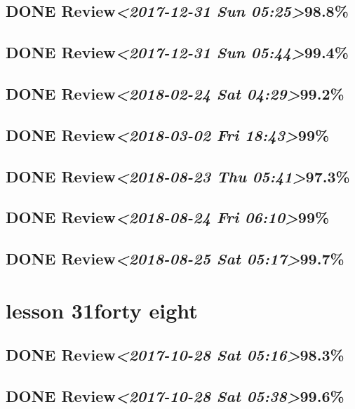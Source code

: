 \documentclass[11pt]{ctexart}
\begin{document}
\subsection{{\bfseries\sffamily DONE} Review\textit{<2017-12-31 Sun 05:25>}98.8\%}
\label{sec:org800593f}
\subsection{{\bfseries\sffamily DONE} Review\textit{<2017-12-31 Sun 05:44>}99.4\%}
\label{sec:org8557818}
\subsection{{\bfseries\sffamily DONE} Review\textit{<2018-02-24 Sat 04:29>}99.2\%}
\label{sec:org5133f05}
\subsection{{\bfseries\sffamily DONE} Review\textit{<2018-03-02 Fri 18:43>}99\%}
\label{sec:orgd3ca5e7}
\subsection{{\bfseries\sffamily DONE} Review\textit{<2018-08-23 Thu 05:41>}97.3\%}
\label{sec:orgdf9a2c3}
\subsection{{\bfseries\sffamily DONE} Review\textit{<2018-08-24 Fri 06:10>}99\%}
\label{sec:org1005b5a}
\subsection{{\bfseries\sffamily DONE} Review\textit{<2018-08-25 Sat 05:17>}99.7\%}
\label{sec:orga892c4b}
\section{lesson 31forty eight}
\label{sec:org9cde4fe}
\subsection{{\bfseries\sffamily DONE} Review\textit{<2017-10-28 Sat 05:16>}98.3\%}
\label{sec:orged74a3f}
\subsection{{\bfseries\sffamily DONE} Review\textit{<2017-10-28 Sat 05:38>}99.6\%}
\label{sec:orga6fb79c}
\end{document}
